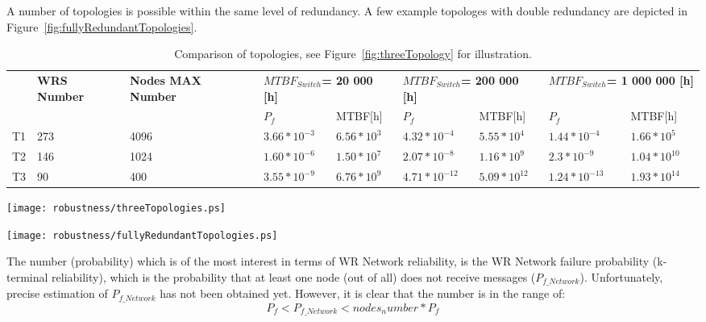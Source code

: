 A number of topologies is possible within the same level of redundancy. A few
example topologes with double redundancy are depicted in
Figure~\ref{fig:fullyRedundantTopologies}.

\begin{table}[ht]
\caption{Comparison of topologies, see Figure~\ref{fig:threeTopology}
for illustration.}
\centering
\begin{tabular}{|p{0.5cm}|p{1cm}|p{1.1cm}|p{1.7cm}|p{1.5cm}|p{1.9cm}|p{1.7cm}
|p{1.9cm}|p{1.7cm}|}        \hline
& \textbf{WRS Number} &
\textbf{Nodes MAX Number} &  
\multicolumn{2}{|p{3cm}|}{\textbf{$MTBF_{Switch}$=    20 000 [h] }} &  
\multicolumn{2}{|p{3cm}|}{\textbf{$MTBF_{Switch}$=   200 000 [h] }} &
\multicolumn{2}{|p{3cm}|}{\textbf{$MTBF_{Switch}$= 1 000 000 [h] }}\\
 & & & $P_f$ & MTBF[h] & $P_f$ & MTBF[h] &
$P_f$   & MTBF[h] \\ \hline

T1 &  273 &  4096  
& $ 3.66*10^{-3}$  & $ 6.56*10^{3}$
& $4.32*10^{-4}$  &  $ 5.55*10^{4}$    
& $1.44*10^{-4}$  &  $ 1.66*10^{5}$  \\ \hline

T2 &  146 &  1024  
& $ 1.60*10^{-6}$  &  $ 1.50*10^{7}$
& $ 2.07*10^{-8}$  &  $ 1.16*10^{9}$    
& $ 2.3*10^{-9}$   &  $ 1.04*10^{10}$   \\ \hline

T3 &  90  &  400   
& $ 3.55*10^{-9}$  &  $ 6.76*10^{9}$
& $ 4.71*10^{-12}$ &  $ 5.09*10^{12}$    
& $ 1.24*10^{-13}$ &  $ 1.93*10^{14}$  \\ \hline
\end{tabular}
\label{tab:nonRedundantTopology}
\end{table}


\begin{center}
	\texttt{[image: robustness/threeTopologies.ps]}
	\label{fig:threeTopology}
\end{center}

\begin{center}
	\texttt{[image: robustness/fullyRedundantTopologies.ps]}
	\label{fig:fullyRedundantTopologies}
\end{center}

The number (probability) which is of the most interest in terms of WR Network
reliability, is the WR Network failure probability (k-terminal reliability),
which is the probability that at least one node (out of all) does not receive
messages ($P_{f\_Network}$). Unfortunately, precise estimation of
$P_{f\_Network}$ has not been obtained yet. However, it is clear that the number
is in the range of:
\begin{equation}
       P_f < P_{f\_Network} < nodes_number * P_f
\end{equation}

